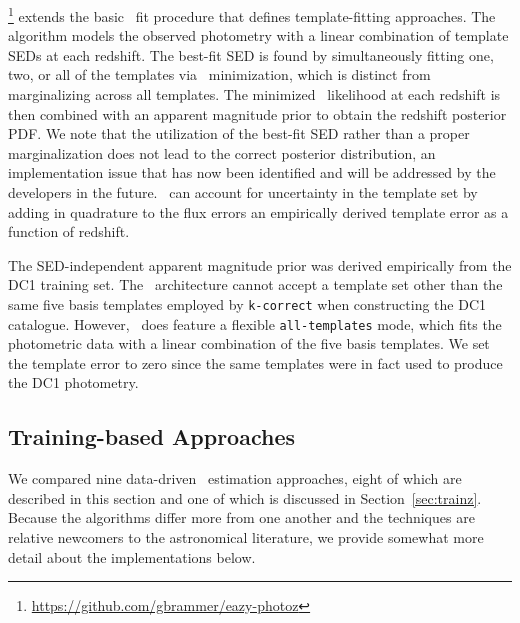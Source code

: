 \eazy \footnote{\url{https://github.com/gbrammer/eazy-photoz}} \citep[Easy and Accurate Photometric Redshifts from Yale,][]{Brammer:08} extends the basic \chisq\ fit procedure that defines template-fitting approaches.
The algorithm models the observed photometry with a linear combination of template SEDs at each redshift.
The best-fit SED is found by simultaneously fitting one, two, or all of the templates via \chisq\ minimization, which is distinct from marginalizing across all templates.
The minimized \chisq\ likelihood at each redshift is then combined with an apparent magnitude prior to obtain the redshift posterior PDF.
We note that the utilization of the best-fit SED rather than a proper marginalization does not lead to the correct posterior distribution, an implementation issue that has now been identified and will be addressed by the developers in the future.
\eazy\ can account for uncertainty in the template set by adding in quadrature to the flux errors an empirically derived template error as a function of redshift.

The SED-independent apparent magnitude prior was derived empirically from the DC1 training set.
The \eazy\ architecture cannot accept a template set other than the same five basis templates employed by \texttt{k-correct} when constructing the DC1 catalogue.
However, \eazy\ does feature a flexible \texttt{all-templates} mode, which fits the photometric data with a linear combination of the five basis templates.
We set the template error to zero since the same templates were in fact used to produce the DC1 photometry.

\subsection{Training-based Approaches}
\label{sec:trainingcodes}

We compared nine data-driven \pz\ estimation approaches, eight of which are described in this section and one of which is discussed in Section~\ref{sec:trainz}.
Because the algorithms differ more from one another and the techniques are relative newcomers to the astronomical literature, we provide somewhat more detail about the implementations below.
%


